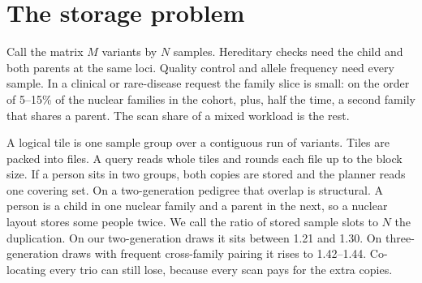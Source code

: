 \documentclass[11pt]{article}
\begin{document}
\begin{abstract}
Four further counts use synthetic arrivals and sit outside that cohort search.
An append-only log copies one split family in 120 bytes against a 4{,}800-byte rebuild of the same 120 people, and the retained log grows to 8{,}000 bytes because the old runs stay.
A Merkle check of 32 trio commitments returns 120 bytes on a 192-byte proof.
On an orthogonal genotype--phenotype instance the joint-query minimum switches at Mendelian fraction \(1/2\), and a query that needs only one of the two payloads prefers separate files at every fraction.
On the first 3{,}000 biallelic sites of the high-coverage chromosome~22 panel, the three columns of one real trio stitch to 9{,}000 bytes inside one 64\,KB block of a packed file of 10{,}027{,}008 bytes.
An unbuffered read of the stitch took 0.108\,ms, against 7.45\,ms for that file.
The same dosages as one Parquet row group are 15{,}069 bytes for the trio and 9{,}644{,}279 bytes for every sample.
\end{abstract}

\section{The storage problem}
\label{sec:problem}

Call the matrix $M$ variants by $N$ samples.
Hereditary checks need the child and both parents at the same loci.
Quality control and allele frequency need every sample.
In a clinical or rare-disease request the family slice is small: on the order of 5--15\% of the nuclear families in the cohort, plus, half the time, a second family that shares a parent.
The scan share of a mixed workload is the rest.

A logical tile is one sample group over a contiguous run of variants.
Tiles are packed into files.
A query reads whole tiles and rounds each file up to the block size.
If a person sits in two groups, both copies are stored and the planner reads one covering set.
On a two-generation pedigree that overlap is structural.
A person is a child in one nuclear family and a parent in the next, so a nuclear layout stores some people twice.
We call the ratio of stored sample slots to $N$ the duplication.
On our two-generation draws it sits between 1.21 and 1.30.
On three-generation draws with frequent cross-family pairing it rises to 1.42--1.44.
Co-locating every trio can still lose, because every scan pays for the extra copies.
\end{document}
